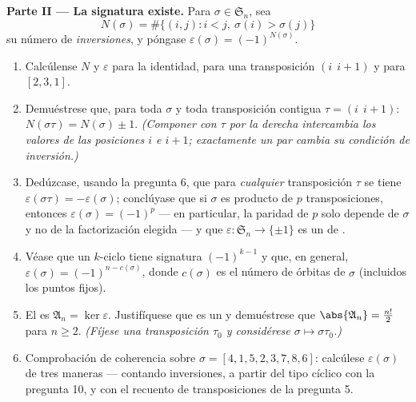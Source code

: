 \begin{problem}
\medskip
\noindent\textbf{Parte II --- La signatura existe.} Para $\sigma
\in \mathfrak S_n$, sea
\[
N(\sigma) = \#\bigl\{(i, j) : i < j,\ \sigma(i) >
\sigma(j)\bigr\}
\]
su número de \emph{inversiones}, y póngase $\varepsilon(\sigma) =
(-1)^{N(\sigma)}$.
\begin{enumerate}[resume]
  \item Calcúlense $N$ y $\varepsilon$ para la identidad, para una
        transposición $(i\ \ i{+}1)$ y para $[2, 3, 1]$.
  \item Demuéstrese que, para toda $\sigma$ y toda transposición
        contigua $\tau = (i\ \ i{+}1)$: $N(\sigma\tau) = N(\sigma) \pm
        1$. \emph{(Componer con $\tau$ por la derecha intercambia los
        valores de las posiciones $i$ e $i + 1$; exactamente un par
        cambia su condición de inversión.)}
  \item Dedúzcase, usando la pregunta 6, que para \emph{cualquier}
        transposición $\tau$ se tiene $\varepsilon(\sigma\tau) =
        -\varepsilon(\sigma)$; conclúyase que si $\sigma$ es producto
        de $p$ transposiciones, entonces $\varepsilon(\sigma) =
        (-1)^p$ --- en particular, la paridad de $p$ solo depende de
        $\sigma$ y no de la factorización elegida --- y que
        $\varepsilon \colon \mathfrak S_n \to \{\pm 1\}$ es un
         de .
  \item Véase que un $k$-ciclo tiene signatura $(-1)^{k-1}$ y que, en
        general, $\varepsilon(\sigma) = (-1)^{n - c(\sigma)}$, donde
        $c(\sigma)$ es el número de órbitas de $\sigma$ (incluidos los
        puntos fijos).
  \item El \emph{} es $\mathfrak A_n =
        \ker\varepsilon$. Justifíquese que es un  y
        demuéstrese que $\abs{\mathfrak A_n} = \frac{n!}2$ para
        $n \geq 2$. \emph{(Fíjese una transposición $\tau_0$ y
        considérese $\sigma
        \mapsto \sigma\tau_0$.)}
  \item Comprobación de coherencia sobre $\sigma = [4, 1, 5, 2, 3, 7,
        8, 6]$: calcúlese $\varepsilon(\sigma)$ de tres maneras ---
        contando inversiones, a partir del tipo cíclico con la
        pregunta 10, y con el recuento de transposiciones de la pregunta 5.
\end{enumerate}


\end{problem}
